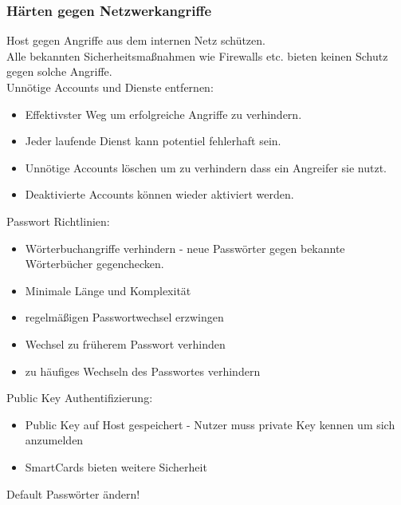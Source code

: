 \documentclass{article} %
\begin{document}
\subsubsection{Härten gegen Netzwerkangriffe}
Host gegen Angriffe aus dem internen Netz schützen.\\
Alle bekannten Sicherheitsmaßnahmen wie Firewalls etc. bieten keinen Schutz gegen solche Angriffe.\\
Unnötige Accounts und Dienste entfernen:
\begin{itemize}
	\item Effektivster Weg um erfolgreiche Angriffe zu verhindern.
    \item Jeder laufende Dienst kann potentiel fehlerhaft sein.
    \item Unnötige Accounts löschen um zu verhindern dass ein Angreifer sie nutzt.
    \item Deaktivierte Accounts können wieder aktiviert werden.
\end{itemize}
Passwort Richtlinien:
\begin{itemize}
	\item Wörterbuchangriffe verhindern - neue Passwörter gegen bekannte Wörterbücher gegenchecken.
    \item Minimale Länge und Komplexität
    \item regelmäßigen Passwortwechsel erzwingen
    \item Wechsel zu früherem Passwort verhinden
    \item zu häufiges Wechseln des Passwortes verhindern
\end{itemize}
Public Key Authentifizierung:
\begin{itemize}
	\item Public Key auf Host gespeichert - Nutzer muss private Key kennen um sich anzumelden
    \item SmartCards bieten weitere Sicherheit
\end{itemize}
Default Passwörter ändern!\\
\end{document}

